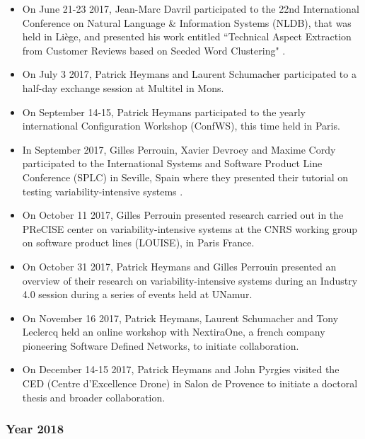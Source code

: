 \begin{itemize}
   \item On June 21-23 2017, Jean-Marc Davril participated to the 22nd 
International Conference on Natural Language \& Information Systems (NLDB), that 
was held in Li{\`e}ge, and presented his work entitled ``Technical Aspect 
Extraction from Customer Reviews based on Seeded Word Clustering" 
\cite{Davril17}.  
   
   \item On July 3 2017, Patrick Heymans and Laurent Schumacher participated to 
a half-day exchange session at Multitel in Mons.
   
   \item On September 14-15, Patrick Heymans participated to the yearly 
international Configuration Workshop (ConfWS), this time held in Paris.
   
   \item  In September 2017, Gilles Perrouin, Xavier Devroey and Maxime Cordy 
participated to the International Systems and Software Product Line Conference 
(SPLC) in Seville, Spain where they presented their tutorial on testing 
variability-intensive systems \cite{DBLP:conf/splc/PerrouinDC17}. 
   
   \item On October 11 2017, Gilles Perrouin presented research carried out in 
the PReCISE center on variability-intensive systems at the CNRS working group on 
software product lines (LOUISE), in Paris France.
    
   \item On October 31 2017, Patrick Heymans and Gilles Perrouin presented an 
overview of their research on variability-intensive systems during an Industry 
4.0 session during a series of events held at UNamur.
    
   \item On November 16 2017, Patrick Heymans, Laurent Schumacher and Tony 
Leclercq held an online workshop with NextiraOne, a french company pioneering 
Software Defined Networks, to initiate collaboration.
    
   \item On December 14-15 2017, Patrick Heymans and John Pyrgies visited the 
CED (Centre d'Excellence Drone) in Salon de Provence to initiate a doctoral 
thesis and broader collaboration.
\end{itemize}

\subsubsection{Year 2018}
\label{sec:2018}

